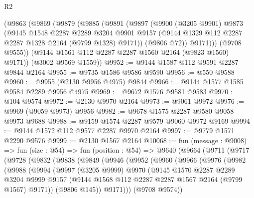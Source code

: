 \begin{lexlean}{R2}
\begin{coremodule}
    (@9863
      (@9869
        (@9879
          (@9885
            (@9891
              (@9897
                (@9900
                  (@3205 @9901)
                  @9873
                  (@9145
                    @1548
                    @2287
                    @2289
                    @3204
                    @9901
                    @9157
                    (@9144 @1329 @112 @2287 @2287 @1328 @2164 (@9799 @1328) @9171))
                  (@9806 @72))
                @9171)))
          (@9708 @9555))
        (@9144 @1561 @112 @2287 @2287 @1560 @2164 (@9823 @1560) @9171))
      (@3002 @9569 @1559))
@9952 := @9144 @1587 @112 @9591 @2287 @9844 @2164
@9955 := @9735 @1586 @9586 @9590
@9956 := @550 @9588
@9960 := @9955 (@2130 @9956 @4975) @9844
@9966 := @9144 @1577 @1585 @9584 @2289 @9956 @4975
@9969 := @9672 @1576 @9581 @9583
@9970 := @104 @9574
@9972 := @2130 @9970 @2164
@9973 := @9061 @9972
@9976 := @9969 (@9059 @9973) @9956
@9982 := @9678 @1575 @2287 @9580 @9058 @9973 @9688
@9988 := @9159 @1574 @2287 @9579 @9060 @9972 @9169
@9994 := @9144 @1572 @112 @9577 @2287 @9970 @2164
@9997 := @9779 @1571 @2290 @9576
@9999 := @2130 @1567 @2164
@10068 := fun (message : @9008) =>
  fun (size : @54) =>
  fun (position : @54) =>
  @9640
    (@9664
      (@9711
        (@9717
          (@9728
            (@9832
              (@9838
                (@9849
                  (@9946
                    (@9952
                      (@9960
                        (@9966
                          (@9976
                            (@9982
                              (@9988
                                (@9994
                                  (@9997
                                    (@3205 @9999)
                                    @9970
                                    (@9145
                                      @1570
                                      @2287
                                      @2289
                                      @3204
                                      @9999
                                      @9157
                                      (@9144
                                        @1568
                                        @112
                                        @2287
                                        @2287
                                        @1567
                                        @2164
                                        (@9799 @1567)
                                        @9171))
                                    (@9806 @145))
                                  @9171)))
                            (@9708 @9574))

\end{coremodule}
\end{lexlean}
